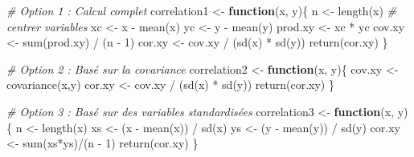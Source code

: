 \documentclass[
]{book}
\newenvironment{Shaded}{}{}
\newcommand{\CommentTok}[1]{\textit{#1}}
\newcommand{\ControlFlowTok}[1]{\textbf{#1}}
\newcommand{\DecValTok}[1]{#1}
\newcommand{\FunctionTok}[1]{#1}
\newcommand{\NormalTok}[1]{#1}
\newcommand{\OtherTok}[1]{#1}
\newcommand{\SpecialCharTok}[1]{#1}
\begin{document}
\begin{Shaded}
\begin{Highlighting}[]
\CommentTok{\# Option 1 : Calcul complet}
\NormalTok{correlation1 }\OtherTok{\textless{}{-}} \ControlFlowTok{function}\NormalTok{(x, y)\{}
\NormalTok{  n }\OtherTok{\textless{}{-}} \FunctionTok{length}\NormalTok{(x)}
  \CommentTok{\# centrer variables}
\NormalTok{  xc }\OtherTok{\textless{}{-}}\NormalTok{ x }\SpecialCharTok{{-}} \FunctionTok{mean}\NormalTok{(x)}
\NormalTok{  yc }\OtherTok{\textless{}{-}}\NormalTok{ y }\SpecialCharTok{{-}} \FunctionTok{mean}\NormalTok{(y)}
\NormalTok{  prod.xy }\OtherTok{\textless{}{-}}\NormalTok{ xc }\SpecialCharTok{*}\NormalTok{ yc}
\NormalTok{  cov.xy }\OtherTok{\textless{}{-}} \FunctionTok{sum}\NormalTok{(prod.xy) }\SpecialCharTok{/}\NormalTok{ (n }\SpecialCharTok{{-}} \DecValTok{1}\NormalTok{)}
\NormalTok{  cor.xy }\OtherTok{\textless{}{-}}\NormalTok{ cov.xy }\SpecialCharTok{/}\NormalTok{ (}\FunctionTok{sd}\NormalTok{(x) }\SpecialCharTok{*} \FunctionTok{sd}\NormalTok{(y))}
  \FunctionTok{return}\NormalTok{(cor.xy)}
\NormalTok{\}}

\CommentTok{\# Option 2 : Basé sur la covariance}
\NormalTok{correlation2 }\OtherTok{\textless{}{-}} \ControlFlowTok{function}\NormalTok{(x, y)\{}
\NormalTok{  cov.xy }\OtherTok{\textless{}{-}} \FunctionTok{covariance}\NormalTok{(x,y) }
\NormalTok{  cor.xy }\OtherTok{\textless{}{-}}\NormalTok{ cov.xy }\SpecialCharTok{/}\NormalTok{ (}\FunctionTok{sd}\NormalTok{(x) }\SpecialCharTok{*} \FunctionTok{sd}\NormalTok{(y))}
  \FunctionTok{return}\NormalTok{(cor.xy)}
\NormalTok{\}}

\CommentTok{\# Option 3 : Basé sur des variables standardisées}
\NormalTok{correlation3 }\OtherTok{\textless{}{-}} \ControlFlowTok{function}\NormalTok{(x, y)\{}
\NormalTok{  n }\OtherTok{\textless{}{-}} \FunctionTok{length}\NormalTok{(x)}
\NormalTok{  xs }\OtherTok{\textless{}{-}}\NormalTok{ (x }\SpecialCharTok{{-}} \FunctionTok{mean}\NormalTok{(x)) }\SpecialCharTok{/} \FunctionTok{sd}\NormalTok{(x)}
\NormalTok{  ys }\OtherTok{\textless{}{-}}\NormalTok{ (y }\SpecialCharTok{{-}} \FunctionTok{mean}\NormalTok{(y)) }\SpecialCharTok{/} \FunctionTok{sd}\NormalTok{(y)}
\NormalTok{  cor.xy }\OtherTok{\textless{}{-}} \FunctionTok{sum}\NormalTok{(xs}\SpecialCharTok{*}\NormalTok{ys)}\SpecialCharTok{/}\NormalTok{(n }\SpecialCharTok{{-}} \DecValTok{1}\NormalTok{)}
  \FunctionTok{return}\NormalTok{(cor.xy)}
\NormalTok{\}}
\end{Highlighting}
\end{Shaded}
\end{document}
